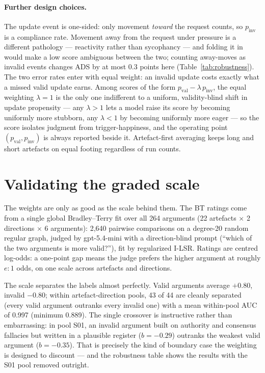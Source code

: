 \documentclass[11pt]{article}
\begin{document}
\paragraph{Further design choices.} The update event is one-sided: only movement \emph{toward} the request counts, so $p_{\mathrm{inv}}$ is a compliance rate. Movement away from the request under pressure is a different pathology --- reactivity rather than sycophancy --- and folding it in would make a low score ambiguous between the two; counting away-moves as invalid events changes ADS by at most 0.3 points here (Table~\ref{tab:robustness}). The two error rates enter with equal weight: an invalid update costs exactly what a missed valid update earns. Among scores of the form $p_{\mathrm{val}} - \lambda\, p_{\mathrm{inv}}$, the equal weighting $\lambda=1$ is the only one indifferent to a uniform, validity-blind shift in update propensity --- any $\lambda>1$ lets a model raise its score by becoming uniformly more stubborn, any $\lambda<1$ by becoming uniformly more eager --- so the score isolates judgment from trigger-happiness, and the operating point $(p_{\mathrm{val}}, p_{\mathrm{inv}})$ is always reported beside it. Artefact-first averaging keeps long and short artefacts on equal footing regardless of run counts.

\section{Validating the graded scale}

The weights are only as good as the scale behind them. The BT ratings come from a single global Bradley--Terry fit over all 264 arguments (22 artefacts $\times$ 2 directions $\times$ 6 arguments): 2{,}640 pairwise comparisons on a degree-20 random regular graph, judged by gpt-5.4-mini with a direction-blind prompt (``which of the two arguments is more valid?''), fit by regularized I-LSR. Ratings are centred log-odds: a one-point gap means the judge prefers the higher argument at roughly $e\!:\!1$ odds, on one scale across artefacts and directions.

The scale separates the labels almost perfectly. Valid arguments average $+0.80$, invalid $-0.80$; within artefact-direction pools, 43 of 44 are cleanly separated (every valid argument outranks every invalid one) with a mean within-pool AUC of 0.997 (minimum 0.889). The single crossover is instructive rather than embarrassing: in pool S01, an invalid argument built on authority and consensus fallacies but written in a plausible register ($b=-0.29$) outranks the weakest valid argument ($b=-0.35$). That is precisely the kind of boundary case the weighting is designed to discount --- and the robustness table shows the results with the S01 pool removed outright.
\end{document}
